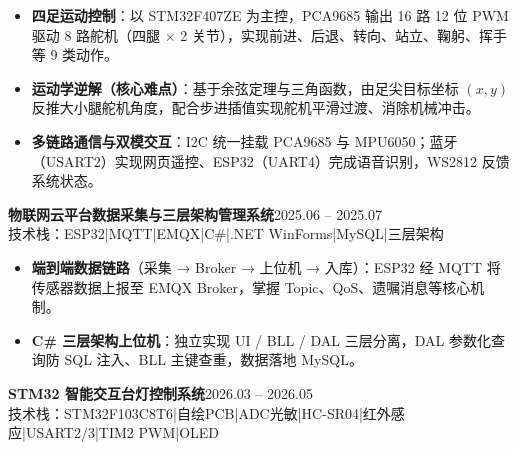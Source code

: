 \documentclass[10pt,a4paper]{article}
\newcommand{\projectblock}[3]{%
    {\bfseries\color{darktext}#1}\hfill{\color{graytext}#2}\\%
    {\small\color{graytext}#3}%
    \vspace{0.2em}%
}
\begin{document}
\begin{itemize}[leftmargin=1.5em, itemsep=2pt, parsep=0pt, topsep=2pt]
    \item \textbf{四足运动控制}：以 STM32F407ZE 为主控，PCA9685 输出 16 路 12 位 PWM 驱动 8 路舵机（四腿 $\times$ 2 关节），实现前进、后退、转向、站立、鞠躬、挥手等 9 类动作。
    \item \textbf{运动学逆解（核心难点）}：基于余弦定理与三角函数，由足尖目标坐标 $(x, y)$ 反推大小腿舵机角度，配合步进插值实现舵机平滑过渡、消除机械冲击。
    \item \textbf{多链路通信与双模交互}：I2C 统一挂载 PCA9685 与 MPU6050；蓝牙（USART2）实现网页遥控、ESP32（UART4）完成语音识别，WS2812 反馈系统状态。
\end{itemize}

\vspace{0.15em}

\projectblock{物联网云平台数据采集与三层架构管理系统}{2025.06 -- 2025.07}{技术栈：ESP32\hspace{0.3em}|\hspace{0.3em}MQTT\hspace{0.3em}|\hspace{0.3em}EMQX\hspace{0.3em}|\hspace{0.3em}C\#\hspace{0.3em}|\hspace{0.3em}.NET WinForms\hspace{0.3em}|\hspace{0.3em}MySQL\hspace{0.3em}|\hspace{0.3em}三层架构}

\begin{itemize}[leftmargin=1.5em, itemsep=2pt, parsep=0pt, topsep=2pt]
    \item \textbf{端到端数据链路}（采集 → Broker → 上位机 → 入库）：ESP32 经 MQTT 将传感器数据上报至 EMQX Broker，掌握 Topic、QoS、遗嘱消息等核心机制。
    \item \textbf{C\# 三层架构上位机}：独立实现 UI / BLL / DAL 三层分离，DAL 参数化查询防 SQL 注入、BLL 主键查重，数据落地 MySQL。
\end{itemize}

\vspace{0.15em}

\projectblock{STM32 智能交互台灯控制系统}{2026.03 -- 2026.05}{技术栈：STM32F103C8T6\hspace{0.3em}|\hspace{0.3em}自绘PCB\hspace{0.3em}|\hspace{0.3em}ADC光敏\hspace{0.3em}|\hspace{0.3em}HC-SR04\hspace{0.3em}|\hspace{0.3em}红外感应\hspace{0.3em}|\hspace{0.3em}USART2/3\hspace{0.3em}|\hspace{0.3em}TIM2 PWM\hspace{0.3em}|\hspace{0.3em}OLED}
\end{document}
